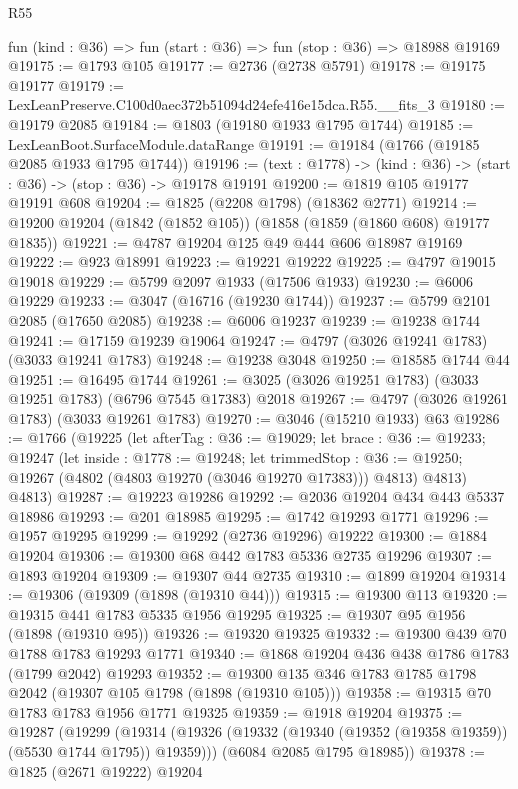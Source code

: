 \begin{lexlean}{R55}
\begin{coremodule}
  fun (kind : @36) => fun (start : @36) => fun (stop : @36) => @18988 @19169
@19175 := @1793 @105
@19177 := @2736 (@2738 @5791)
@19178 := @19175 @19177
@19179 := LexLeanPreserve.C100d0aec372b51094d24efe416e15dca.R55.__fits_3
@19180 := @19179 @2085
@19184 := @1803 (@19180 @1933 @1795 @1744)
@19185 := LexLeanBoot.SurfaceModule.dataRange
@19191 := @19184 (@1766 (@19185 @2085 @1933 @1795 @1744))
@19196 := (text : @1778) -> (kind : @36) -> (start : @36) -> (stop : @36) -> @19178 @19191
@19200 := @1819 @105 @19177 @19191 @608
@19204 := @1825 (@2208 @1798) (@18362 @2771)
@19214 := @19200 @19204 (@1842 (@1852 @105)) (@1858 (@1859 (@1860 @608) @19177 @1835))
@19221 := @4787 @19204 @125 @49 @444 @606 @18987 @19169
@19222 := @923 @18991
@19223 := @19221 @19222
@19225 := @4797 @19015 @19018
@19229 := @5799 @2097 @1933 (@17506 @1933)
@19230 := @6006 @19229
@19233 := @3047 (@16716 (@19230 @1744))
@19237 := @5799 @2101 @2085 (@17650 @2085)
@19238 := @6006 @19237
@19239 := @19238 @1744
@19241 := @17159 @19239 @19064
@19247 := @4797 (@3026 @19241 @1783) (@3033 @19241 @1783)
@19248 := @19238 @3048
@19250 := @18585 @1744 @44
@19251 := @16495 @1744
@19261 := @3025 (@3026 @19251 @1783) (@3033 @19251 @1783) (@6796 @7545 @17383) @2018
@19267 := @4797 (@3026 @19261 @1783) (@3033 @19261 @1783)
@19270 := @3046 (@15210 @1933) @63
@19286 := @1766
    (@19225
      (let afterTag : @36 := @19029;
      let brace : @36 := @19233;
      @19247
        (let inside : @1778 := @19248;
        let trimmedStop : @36 := @19250; @19267 (@4802 (@4803 @19270 (@3046 @19270 @17383))) @4813)
        @4813)
      @4813)
@19287 := @19223 @19286
@19292 := @2036 @19204 @434 @443 @5337 @18986
@19293 := @201 @18985
@19295 := @1742 @19293 @1771
@19296 := @1957 @19295
@19299 := @19292 (@2736 @19296) @19222
@19300 := @1884 @19204
@19306 := @19300 @68 @442 @1783 @5336 @2735 @19296
@19307 := @1893 @19204
@19309 := @19307 @44 @2735
@19310 := @1899 @19204
@19314 := @19306 (@19309 (@1898 (@19310 @44)))
@19315 := @19300 @113
@19320 := @19315 @441 @1783 @5335 @1956 @19295
@19325 := @19307 @95 @1956 (@1898 (@19310 @95))
@19326 := @19320 @19325
@19332 := @19300 @439 @70 @1788 @1783 @19293 @1771
@19340 := @1868 @19204 @436 @438 @1786 @1783 (@1799 @2042) @19293
@19352 := @19300 @135 @346 @1783 @1785 @1798 @2042 (@19307 @105 @1798 (@1898 (@19310 @105)))
@19358 := @19315 @70 @1783 @1783 @1956 @1771 @19325
@19359 := @1918 @19204
@19375 := @19287
    (@19299
      (@19314 (@19326 (@19332 (@19340 (@19352 (@19358 @19359)) (@5530 @1744 @1795)) @19359)))
      (@6084 @2085 @1795 @18985))
@19378 := @1825 (@2671 @19222) @19204

\end{coremodule}
\end{lexlean}
